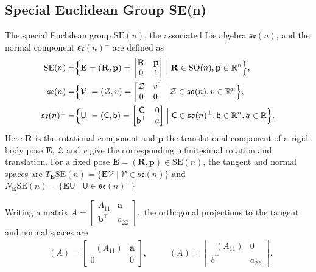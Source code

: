 \documentclass[11pt, a4paper, onecolumn]{article}
\newcommand{\SOn}{\mathrm{SO}(n)}
\newcommand{\son}{\mathfrak{so}(n)}
\newcommand{\sonp}{\mathfrak{so}(n)^{\perp}}
\newcommand{\SEn}{\mathrm{SE}(n)}
\newcommand{\sen}{\mathfrak{se}(n)}
\newcommand{\senp}{\mathfrak{se}(n)^{\perp}}
\newcommand{\R}{\mathbb{R}}
\newcommand{\E}{\mathbb{E}}
\newcommand{\bfE}{\bf{E}}
\newcommand{\bfR}{\mathbf{R}}
\newcommand{\Z}{\mathcal{Z}}
\renewcommand{\bf}[1]{\mathbf{#1}}
\newcommand{\tg}[1]{\mathcal{#1}}
\newcommand{\nm}[1]{\mathsf{#1}}
\DeclareMathOperator{\POtg}{\Pi^O_{T_{\bf R}}}
\DeclareMathOperator{\POnm}{\Pi^O_{N_{\bf R}}}
\DeclareMathOperator{\PEtg}{\Pi^E_{T_{\E}}}
\DeclareMathOperator{\PEnm}{\Pi^E_{N_{\E}}}
\begin{document}
\subsection{Special Euclidean Group SE(n)}
The special Euclidean group $\SEn$, the associated Lie algebra $\sen$, and the normal component $\senp$ are defined as
\begin{align*}
    \SEn = & \Bigl\{ \bfE =(\bfR,\bf p) =
      \begin{bmatrix}
         \bfR & \bf p \\
          0 & 1
      \end{bmatrix}
       \Bigm| \bfR\in\SOn,  \bf p\in\mathbb R^{n} \Bigr\}, \\
    \sen  = & 
   \Bigl\{\tg V \ = (\Z , v) =
      \begin{bmatrix}
         \Z & v \\
          0 & 0
      \end{bmatrix}
       \Bigm| 
      \Z \in \son,
      v \in\mathbb R^{n}
   \Bigr\}, \\
    \senp  = & 
   \Bigl\{\nm U \ = (\nm C , \nm b) =
      \begin{bmatrix}
        \nm C & 0 \\
        \nm b^{\top} & a
      \end{bmatrix}
       \Bigm| 
      \nm C \in \sonp,
      \nm b \in\mathbb R^{n},a\in\R
   \Bigr\}.
\end{align*}
Here $\bfR$ is the rotational component and $\bf p$ the translational component of a rigid-body pose $\bfE$, $\Z$ and $v$ give the corresponding infinitesimal rotation and translation. For a fixed pose $\bfE = (\bfR,\bf p)\in\SEn$, the tangent and normal spaces are $T_{\bfE}\SEn  =   \{ \bfE\tg V \mid \tg V\in\sen \}$ and $N_{\bfE}\SEn  =   \{ \bfE\nm U \mid \nm U\in\senp \}$

Writing a matrix
$
   A=\begin{bmatrix}A_{11}&\mathbf a\\ \mathbf b^{\top}&a_{22}\end{bmatrix},
$
the orthogonal projections to the tangent and normal spaces are
\begin{align*}
   \PEtg(A)  = 
   \begin{bmatrix}
     \POtg(A_{11})& \bf a\\
      0 & 0
   \end{bmatrix},
   \qquad 
   \PEnm(A)
    = 
   \begin{bmatrix}
     \POnm(A_{11}) &  0\\
      b^{\top} & a_{22}
   \end{bmatrix}.
\end{align*}
\end{document}
